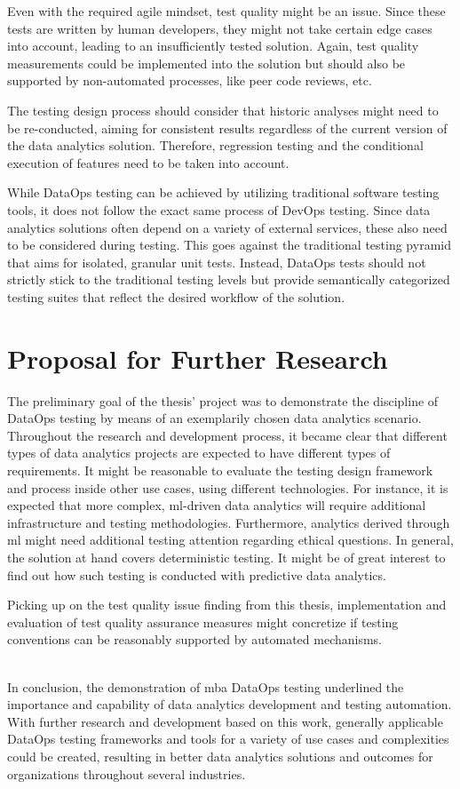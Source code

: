 Even with the required agile mindset, test quality might be an issue. Since these tests are written by human developers, they might not take certain edge cases into account, leading to an insufficiently tested solution. Again, test quality measurements could be implemented into the solution but should also be supported by non-automated processes, like peer code reviews, etc.

The testing design process should consider that historic analyses might need to be re-conducted, aiming for consistent results regardless of the current version of the data analytics solution. Therefore, regression testing and the conditional execution of features need to be taken into account.

While DataOps testing can be achieved by utilizing traditional software testing tools, it does not follow the exact same process of DevOps testing. Since data analytics solutions often depend on a variety of external services, these also need to be considered during testing. This goes against the traditional testing pyramid that aims for isolated, granular unit tests. Instead, DataOps tests should not strictly stick to the traditional testing levels but provide semantically categorized testing suites that reflect the desired workflow of the solution.

\section*{Proposal for Further Research} \addtocounter{section}{1}
The preliminary goal of the thesis' project was to demonstrate the discipline of DataOps testing by means of an exemplarily chosen data analytics scenario. Throughout the research and development process, it became clear that different types of data analytics projects are expected to have different types of requirements. It might be reasonable to evaluate the testing design framework and process inside other use cases, using different technologies. For instance, it is expected that more complex, \acs{ml}-driven data analytics will require additional infrastructure and testing methodologies. Furthermore, analytics derived through \acs{ml} might need additional testing attention regarding ethical questions. In general, the solution at hand covers deterministic testing. It might be of great interest to find out how such testing is conducted with predictive data analytics. \newpage

Picking up on the test quality issue finding from this thesis, implementation and evaluation of test quality assurance measures might concretize if testing conventions can be reasonably supported by automated mechanisms. \\\

In conclusion, the demonstration of \ac{mba} DataOps testing underlined the importance and capability of data analytics development and testing automation. With further research and development based on this work, generally applicable DataOps testing frameworks and tools for a variety of use cases and complexities could be created, resulting in better data analytics solutions and outcomes for organizations throughout several industries.